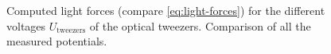 \documentclass[../bericht.tex]{subfiles}
\begin{document}
      \begin{figure}[tb]
        \centering
        \hfill
        \caption{\protect{} Computed light forces (compare \cref{eq:light-forces}) for the different voltages $U_\mathrm{tweezers}$ of the optical tweezers. \protect{} Comparison of all the measured potentials.}
      \end{figure}
\end{document}
